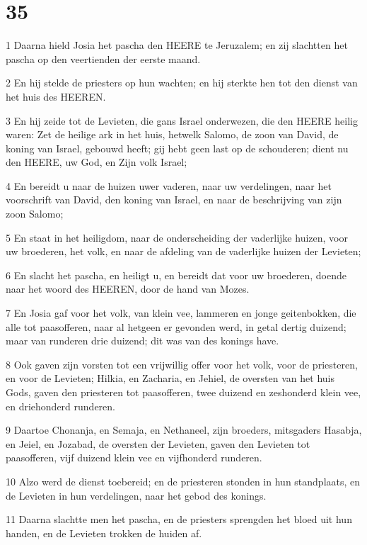 \chapter{35}

\par 1 Daarna hield Josia het pascha den HEERE te Jeruzalem; en zij slachtten het pascha op den veertienden der eerste maand.
\par 2 En hij stelde de priesters op hun wachten; en hij sterkte hen tot den dienst van het huis des HEEREN.
\par 3 En hij zeide tot de Levieten, die gans Israel onderwezen, die den HEERE heilig waren: Zet de heilige ark in het huis, hetwelk Salomo, de zoon van David, de koning van Israel, gebouwd heeft; gij hebt geen last op de schouderen; dient nu den HEERE, uw God, en Zijn volk Israel;
\par 4 En bereidt u naar de huizen uwer vaderen, naar uw verdelingen, naar het voorschrift van David, den koning van Israel, en naar de beschrijving van zijn zoon Salomo;
\par 5 En staat in het heiligdom, naar de onderscheiding der vaderlijke huizen, voor uw broederen, het volk, en naar de afdeling van de vaderlijke huizen der Levieten;
\par 6 En slacht het pascha, en heiligt u, en bereidt dat voor uw broederen, doende naar het woord des HEEREN, door de hand van Mozes.
\par 7 En Josia gaf voor het volk, van klein vee, lammeren en jonge geitenbokken, die alle tot paasofferen, naar al hetgeen er gevonden werd, in getal dertig duizend; maar van runderen drie duizend; dit was van des konings have.
\par 8 Ook gaven zijn vorsten tot een vrijwillig offer voor het volk, voor de priesteren, en voor de Levieten; Hilkia, en Zacharia, en Jehiel, de oversten van het huis Gods, gaven den priesteren tot paasofferen, twee duizend en zeshonderd klein vee, en driehonderd runderen.
\par 9 Daartoe Chonanja, en Semaja, en Nethaneel, zijn broeders, mitsgaders Hasabja, en Jeiel, en Jozabad, de oversten der Levieten, gaven den Levieten tot paasofferen, vijf duizend klein vee en vijfhonderd runderen.
\par 10 Alzo werd de dienst toebereid; en de priesteren stonden in hun standplaats, en de Levieten in hun verdelingen, naar het gebod des konings.
\par 11 Daarna slachtte men het pascha, en de priesters sprengden het bloed uit hun handen, en de Levieten trokken de huiden af.
